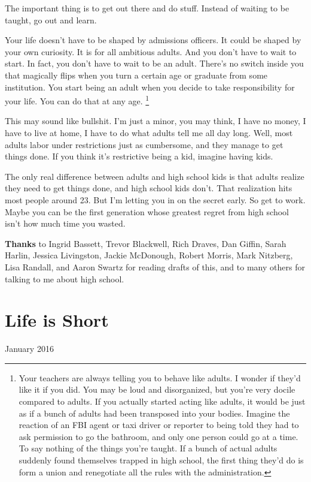 \documentclass[12pt]{book}
\begin{document}
The important thing is to get out there and do stuff. Instead of waiting
to be taught, go out and learn.

Your life doesn't have to be shaped by admissions officers. It could be
shaped by your own curiosity. It is for all ambitious adults. And you
don't have to wait to start. In fact, you don't have to wait to be an
adult. There's no switch inside you that magically flips when you turn a
certain age or graduate from some institution. You start being an adult
when you decide to take responsibility for your life. You can do that at
any age. \footnote{Your teachers are always telling you to behave like adults. I
wonder if they'd like it if you did. You may be loud and disorganized,
but you're very docile compared to adults. If you actually started
acting like adults, it would be just as if a bunch of adults had been
transposed into your bodies. Imagine the reaction of an FBI agent or
taxi driver or reporter to being told they had to ask permission to go
the bathroom, and only one person could go at a time. To say nothing of
the things you're taught. If a bunch of actual adults suddenly found
themselves trapped in high school, the first thing they'd do is form a
union and renegotiate all the rules with the administration.}

This may sound like bullshit. I'm just a minor, you may think, I have no
money, I have to live at home, I have to do what adults tell me all day
long. Well, most adults labor under restrictions just as cumbersome, and
they manage to get things done. If you think it's restrictive being a
kid, imagine having kids.

The only real difference between adults and high school kids is that
adults realize they need to get things done, and high school kids don't.
That realization hits most people around 23. But I'm letting you in on
the secret early. So get to work. Maybe you can be the first generation
whose greatest regret from high school isn't how much time you wasted.


\textbf{Thanks} to Ingrid Bassett, Trevor Blackwell, Rich Draves, Dan
Giffin, Sarah Harlin, Jessica Livingston, Jackie McDonough, Robert
Morris, Mark Nitzberg, Lisa Randall, and Aaron Swartz for reading drafts
of this, and to many others for talking to me about high school.
\chapter{Life is Short}

January 2016
\end{document}
